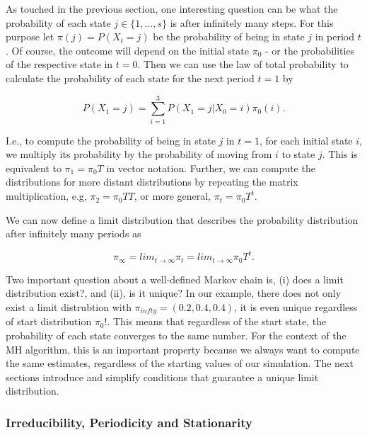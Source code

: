 \documentclass[12pt,english,a4paper,oneside]{article}
\theoremstyle{definition}
\theoremstyle{definition}
\theoremstyle{definition}
\theoremstyle{definition}
\theoremstyle{remark}
\begin{document}
As touched in the previous section, one interesting question can be what the probability of each state \(j \in \{1, ..., s\}\) is after infinitely many steps. For this purpose let \(\pi (j) = P(X_t = j)\) be the probability of being in state \(j\) in period \(t\). Of course, the outcome will depend on the initial state \(\pi_0\) - or the probabilities of the respective state in \(t=0\). Then we can use the law of total probability to calculate the probability of each state for the next period \(t=1\) by

\begin{equation}
\tag{eq:tot-prob}
P(X_1 = j) = \sum_{i=1}^{3} P(X_1 = j | X_0 = i) \pi_0(i).
\end{equation}

I.e., to compute the probability of being in state \(j\) in \(t=1\), for each initial state \(i\), we multiply its probability by the probability of moving from \(i\) to state \(j\). This is equivalent to \(\pi_1 = \pi_0 T\) in vector notation. Further, we can compute the distributions for more distant distributions by repeating the matrix multiplication, e.g, \(\pi_2 = \pi_0 T T\), or more general, \(\pi_t = \pi_0 T^t\).

We can now define a limit distribution that describes the probability distribution after infinitely many periods as

\begin{equation}
\tag{eq:lim-dist}
\pi_{\infty} = lim_{t \rightarrow \infty} \pi_t = lim_{t \rightarrow \infty} \pi_0 T^t.
\end{equation}

Two important question about a well-defined Markov chain is, (i) does a limit distribution exist?, and (ii), is it unique? In our example, there does not only exist a limit distrubtion with \(\pi_{infty} = (0.2, 0.4, 0.4)\), it is even unique regardless of start distribution \(\pi_0\)!. This means that regardless of the start state, the probability of each state converges to the same number. For the context of the MH algorithm, this is an important property because we always want to compute the same estimates, regardless of the starting values of our simulation. The next sections introduce and simplify conditions that guarantee a unique limit distribution.

\hypertarget{irreducibility-periodicity-and-stationarity}{%
\subsubsection{Irreducibility, Periodicity and Stationarity}\label{irreducibility-periodicity-and-stationarity}}
\end{document}
